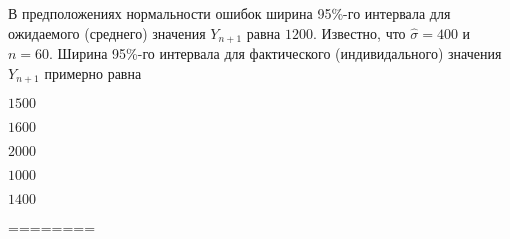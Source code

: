 
\begin{question}
В предположениях нормальности ошибок ширина 95\%-го интервала для
ожидаемого (среднего) значения \(Y_{n+1}\) равна \(1200\). Известно, что
\(\hat\sigma = 400\) и \(n=60\). Ширина 95\%-го интервала для
фактического (индивидального) значения \(Y_{n+1}\) примерно равна
\begin{answerlist}
  \item \(1500\)
  \item \(1600\)
  \item \(2000\)
  \item \(1000\)
  \item \(1400\)
\end{answerlist}
\end{question}

\begin{solution}
========
\end{solution}

